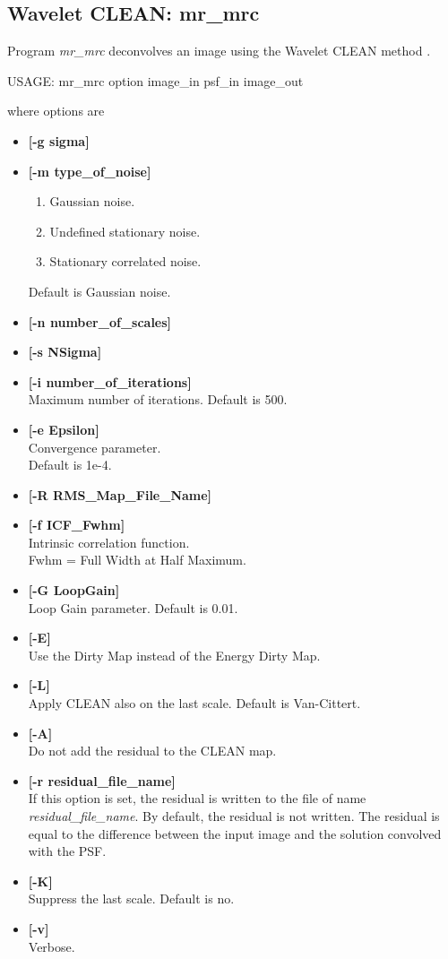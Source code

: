 \begin{itemize}
\subsection{Wavelet CLEAN: mr\_mrc}
Program {\em mr\_mrc} deconvolves an image using the Wavelet 
CLEAN method \cite{starck:book98,starck:book02}.
{\bf
\begin{center}
 USAGE: mr\_mrc option image\_in psf\_in image\_out
\end{center}}
where options are 
\begin{itemize}
\baselineskip=0.4truecm
\item {\bf [-g sigma]}
\item {\bf [-m type\_of\_noise]}
\begin{enumerate}
\baselineskip=0.4truecm
\item Gaussian noise.
\item Undefined stationary noise.
\item Stationary correlated noise.
\end{enumerate}
Default is Gaussian noise.
\item {\bf [-n number\_of\_scales]}
\item {\bf [-s NSigma]} 
\item {\bf [-i number\_of\_iterations]} \\
Maximum number of iterations. Default is  500.
\item {\bf [-e Epsilon]} \\
Convergence parameter. \\
Default is 1e-4.
\item {\bf [-R RMS\_Map\_File\_Name]} 
\item {\bf [-f ICF\_Fwhm]} \\
Intrinsic correlation function. \\
Fwhm = Full Width at Half Maximum.
\item {\bf [-G LoopGain]} \\ 
Loop Gain parameter. Default is 0.01.
\item {\bf [-E]} \\
Use the Dirty Map instead of the Energy Dirty Map. 
\item {\bf [-L]} \\
Apply CLEAN also on the last scale. Default is Van-Cittert.
\item {\bf [-A]} \\
Do not add the residual to the CLEAN map. 
\item {\bf [-r residual\_file\_name]} \\
If this option is set, the residual is written to 
the file of name {\em residual\_file\_name}. By default, the
residual is not written. The residual is equal to the difference between
the input image and the solution convolved with the PSF.
\item {\bf [-K]} \\
Suppress the last scale.  
Default is no.
\item {\bf [-v]} \\
Verbose.
\end{itemize}
\noindent

\end{itemize}
